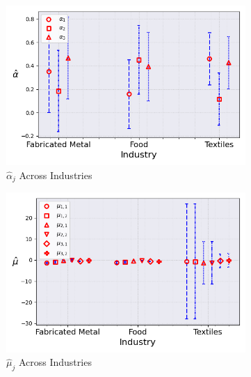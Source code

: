 \documentclass{article}
\begin{document}
\begin{figure}[ht!]
    \centering 
    \caption{Stationary Mixture Model with $\log K$, Import and CIIU Across Industries ($\hat{M}_0 = 3$)}
    \begin{subfigure}[t]{0.32\textwidth}
        \centering
        \includegraphics[width=\textwidth]{figure/stationary_mixture_kmshare_ciiu_alpha_across_industries_m3.png}
        \caption{$\hat\alpha_j$ Across Industries}
    \end{subfigure}
    \begin{subfigure}[t]{0.32\textwidth}
        \centering
        \includegraphics[width=\textwidth]{figure/stationary_mixture_kmshare_ciiu_mu_across_industries_m3.png}
        \caption{$\hat\mu_j$ Across Industries}
    \end{subfigure}
    \begin{subfigure}[t]{0.32\textwidth}

\end{subfigure}
\end{figure}
\end{document}
